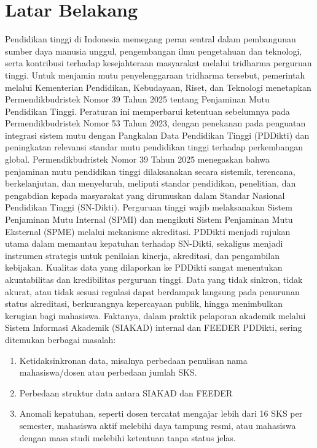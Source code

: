 \documentclass[12pt,a4paper,oneside]{report}
\begin{document}
        \section{Latar Belakang}
            Pendidikan tinggi di Indonesia memegang peran sentral dalam pembangunan sumber daya manusia unggul, pengembangan ilmu pengetahuan dan teknologi, serta kontribusi terhadap kesejahteraan masyarakat melalui tridharma perguruan tinggi.
            Untuk menjamin mutu penyelenggaraan tridharma tersebut, pemerintah melalui Kementerian Pendidikan, Kebudayaan, Riset, dan Teknologi menetapkan Permendikbudristek Nomor 39 Tahun 2025 tentang Penjaminan Mutu Pendidikan Tinggi. Peraturan ini memperbarui ketentuan sebelumnya pada Permendikbudristek Nomor 53 Tahun 2023, dengan penekanan pada penguatan integrasi sistem mutu dengan Pangkalan Data Pendidikan Tinggi (PDDikti) dan peningkatan relevansi standar mutu pendidikan tinggi terhadap perkembangan global.
            Permendikbudristek Nomor 39 Tahun 2025 menegaskan bahwa penjaminan mutu pendidikan tinggi dilaksanakan secara sistemik, terencana, berkelanjutan, dan menyeluruh, meliputi standar pendidikan, penelitian, dan pengabdian kepada masyarakat yang dirumuskan dalam Standar Nasional Pendidikan Tinggi (SN-Dikti). Perguruan tinggi wajib melaksanakan Sistem Penjaminan Mutu Internal (SPMI) dan mengikuti Sistem Penjaminan Mutu Eksternal (SPME) melalui mekanisme akreditasi. PDDikti menjadi rujukan utama dalam memantau kepatuhan terhadap SN-Dikti, sekaligus menjadi instrumen strategis untuk penilaian kinerja, akreditasi, dan pengambilan kebijakan.
            Kualitas data yang dilaporkan ke PDDikti sangat menentukan akuntabilitas dan kredibilitas perguruan tinggi.
            Data yang tidak sinkron, tidak akurat, atau tidak sesuai regulasi dapat berdampak langsung pada penurunan status akreditasi,
            berkurangnya kepercayaan publik, hingga menimbulkan kerugian bagi mahasiswa. Faktanya,
            dalam praktik pelaporan akademik melalui Sistem Informasi Akademik (SIAKAD) internal dan FEEDER PDDikti, sering ditemukan berbagai masalah:
            \begin{enumerate}
                \item Ketidaksinkronan data, misalnya perbedaan penulisan nama mahasiswa/dosen atau perbedaan jumlah SKS.
                \item Perbedaan struktur data antara SIAKAD dan FEEDER
                \item Anomali kepatuhan, seperti dosen tercatat mengajar lebih dari 16 SKS per semester, mahasiswa aktif melebihi daya tampung resmi, atau mahasiswa dengan masa studi melebihi ketentuan tanpa status jelas.
            \end{enumerate}
\end{document}
